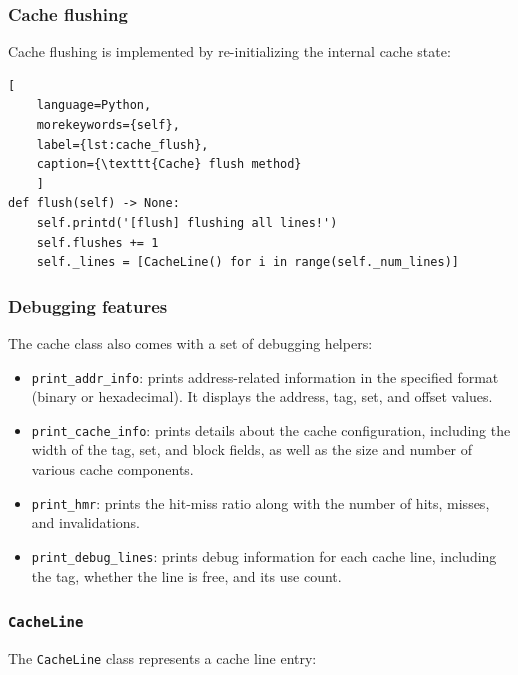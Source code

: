 \subsubsection*{Cache flushing}
\noindent Cache flushing is implemented by re-initializing the internal cache state:

\begin{center}
\centering
\begin{minipage}{\linewidth}
\begin{lstlisting}[
    language=Python,
	morekeywords={self},
    label={lst:cache_flush},
    caption={\texttt{Cache} flush method}
    ]
def flush(self) -> None:
    self.printd('[flush] flushing all lines!')
    self.flushes += 1
    self._lines = [CacheLine() for i in range(self._num_lines)]
\end{lstlisting}
\end{minipage}
\end{center}

\subsubsection*{Debugging features}
\noindent The cache class also comes with a set of debugging helpers:
\begin{itemize}
    \item \texttt{print\_addr\_info}: prints address-related information in the specified format (binary or hexadecimal). It displays the address, tag, set, and offset values.
    \item \texttt{print\_cache\_info}: prints details about the cache configuration, including the width of the tag, set, and block fields, as well as the size and number of various cache components.
    \item \texttt{print\_hmr}: prints the hit-miss ratio along with the number of hits, misses, and invalidations.
    \item \texttt{print\_debug\_lines}: prints debug information for each cache line, including the tag, whether the line is free, and its use count.
\end{itemize}

\subsubsection{\texttt{CacheLine}}

The \texttt{CacheLine} class represents a cache line entry:

